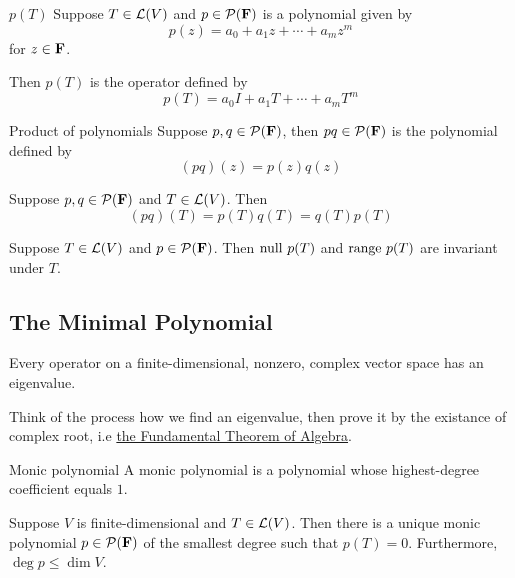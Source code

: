\documentclass[12pt,a4paper]{article}
\begin{document}
    \begin{defi}{$p(T)$}
        Suppose $T\in\mathcal{L}(V)$ and $p\in\mathcal{P}(\mathbf{F})$ is a polynomial given by
        $$
        p(z)=a_0+a_1z+\cdots+a_mz^m
        $$for $z\in\mathbf{F}$.
        
        Then $p(T)$ is the operator defined by
        $$
        p(T)=a_0I+a_1T+\cdots+a_mT^m
        $$
    \end{defi}
    \hfill

    \begin{defi}{Product of polynomials}
        Suppose $p,q\in\mathcal{P}(\mathbf{F})$, then $pq\in\mathcal{P}(\mathbf{F})$ is the polynomial defined by
        $$
        (pq)(z)=p(z)q(z)
        $$
    \end{defi}
    \begin{prop}
        Suppose $p,q\in\mathcal{P}(\mathbf{F})$ and $T\in\mathcal{L}(V)$. Then
        $$
        (pq)(T)=p(T)q(T)=q(T)p(T)
        $$
    \end{prop}
    \hfill

    \begin{prop}
        Suppose $T\in\mathcal{L}(V)$ and $p\in\mathcal{P}(\mathbf{F})$. Then $\operatorname{null\,} p(T)$ and $\operatorname{range\,} p(T)$ are invariant under $T$.
    \end{prop}
    
    \hfill

    \subsection{The Minimal Polynomial}
    \begin{prop}\label{5.14}
        Every operator on a finite-dimensional, nonzero, complex vector space has an eigenvalue.
    \end{prop}
    \begin{remark}
        Think of the process how we find an eigenvalue, then prove it by the existance of complex root, i.e \hyperref[4.7]{the Fundamental Theorem of Algebra}.
    \end{remark}
    \hfill

    \begin{defi}{Monic polynomial}
        A monic polynomial is a polynomial whose highest-degree coefficient equals $1$.
    \end{defi}
    \hfill

    \begin{prop}
        Suppose $V$ is finite-dimensional and $T\in\mathcal{L}(V)$. Then there is a unique monic polynomial $p\in\mathcal{P}(\mathbf{F})$ of the smallest degree such that $p(T)=0$. Furthermore, $\deg p\leq\dim V$.
    \end{prop}
    \hfill
\end{document}
